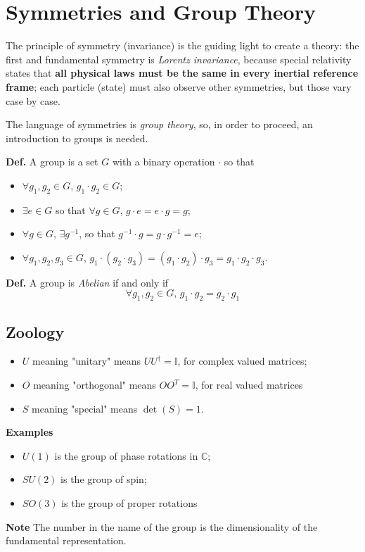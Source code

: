 \section{Symmetries and Group Theory}
The principle of symmetry (invariance) is the guiding light to create a theory:
the first and fundamental symmetry is \textit{Lorentz invariance}, because special
relativity states that \textbf{all physical laws must be the same in every inertial
reference frame}; each particle (state) must also observe other symmetries, but those
vary case by case.

The language of symmetries is \textit{group theory}, so, in order to proceed, an
introduction to groups is needed.

\textbf{Def.} A group is a set $G$ with a binary operation $\cdot$ so that
\begin{itemize}
    \item $\forall g_1,g_2\in G$, $g_1\cdot g_2 \in G$;
    \item $\exists e\in G$ so that $\forall g\in G$, $g\cdot e = e \cdot g = g$;
    \item $\forall g\in G$, $\exists g^{-1}$, so that $g^{-1}\cdot g=g\cdot g^{-1}=e$;
    \item $\forall g_1,g_2,g_3\in G$, $g_1 \cdot (g_2 \cdot g_3) = (g_1\cdot g_2)\cdot
	g_3 = g_1\cdot g_2\cdot g_3$.
\end{itemize}
\textbf{Def.} A group is \textit{Abelian} if and only if
$$\forall g_1,g_2\in G\text{, }g_1\cdot g_2 = g_2\cdot g_1$$
\subsection{Zoology}
\begin{itemize}
    \item $U$ meaning "unitary" means $UU^\dagger=\mathbb{I}$, for complex valued
	matrices;
    \item $O$ meaning "orthogonal" means $OO^T=\mathbb{I}$, for real valued matrices
    \item $S$ meaning "special" means $\det(S)=1$.
\end{itemize}
\newpage
\textbf{Examples}\\
\begin{itemize}
    \item $U(1)$ is the group of phase rotations in $\mathbb{C}$;
    \item $SU(2)$ is the group of spin;
    \item $SO(3)$ is the group of proper rotations
\end{itemize}
\textbf{Note} The number in the name of the group is the dimensionality of the
fundamental representation.

